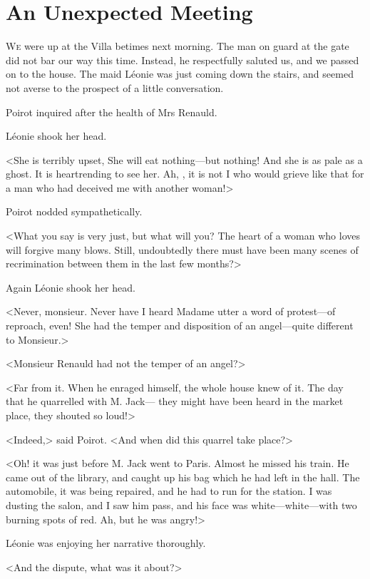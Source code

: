\chapter{An Unexpected Meeting}

\lettrine{W}{e} were up at the Villa betimes next morning. The man on guard at the gate did not bar our way this time. Instead, he respectfully saluted us, and we passed on to the house. The maid Léonie was just coming down the stairs, and seemed not averse to the prospect of a little conversation. 

 Poirot inquired after the health of Mrs Renauld. 

 Léonie shook her head. 

 <She is terribly upset,  She will eat nothing—but nothing! And she is as pale as a ghost. It is heartrending to see her. Ah, , it is not I who would grieve like that for a man who had deceived me with another woman!> 

 Poirot nodded sympathetically. 

 <What you say is very just, but what will you? The heart of a woman who loves will forgive many blows. Still, undoubtedly there must have been many scenes of recrimination between them in the last few months?> 

 Again Léonie shook her head. 

 <Never, monsieur. Never have I heard Madame utter a word of protest—of reproach, even! She had the temper and disposition of an angel—quite different to Monsieur.> 

 <Monsieur Renauld had not the temper of an angel?> 

 <Far from it. When he enraged himself, the whole house knew of it. The day that he quarrelled with M. Jack— they might have been heard in the market place, they shouted so loud!> 

 <Indeed,> said Poirot. <And when did this quarrel take place?> 

 <Oh! it was just before M. Jack went to Paris. Almost he missed his train. He came out of the library, and caught up his bag which he had left in the hall. The automobile, it was being repaired, and he had to run for the station. I was dusting the salon, and I saw him pass, and his face was white—white—with two burning spots of red. Ah, but he was angry!> 

 Léonie was enjoying her narrative thoroughly. 

 <And the dispute, what was it about?> 

